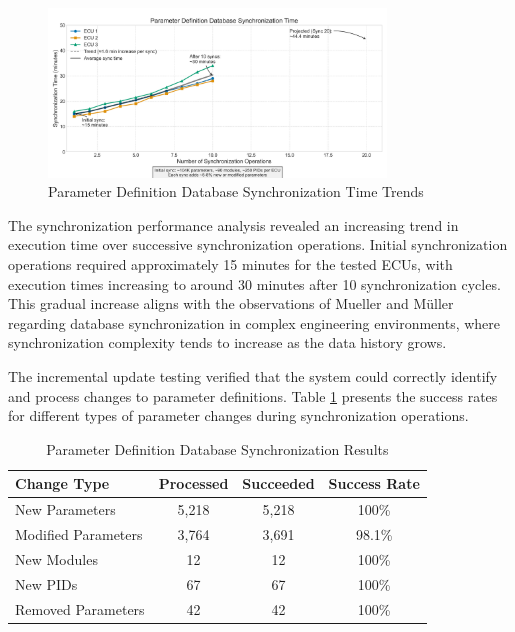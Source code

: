\begin{figure}[h]
    \centering
    \includegraphics[width=0.8\textwidth]{figures/pdd_sync_time_graph.png}
    \caption{Parameter Definition Database Synchronization Time Trends}
    \label{fig:pdd-sync-time}
\end{figure}

The synchronization performance analysis revealed an increasing trend in execution time over successive synchronization operations. Initial synchronization operations required approximately 15 minutes for the tested \acp{ECU}, with execution times increasing to around 30 minutes after 10 synchronization cycles. This gradual increase aligns with the observations of Mueller and Müller \cite{mueller2018conception} regarding database synchronization in complex engineering environments, where synchronization complexity tends to increase as the data history grows.

The incremental update testing verified that the system could correctly identify and process changes to parameter definitions. Table \ref{tab:pdd-sync-results} presents the success rates for different types of parameter changes during synchronization operations.

\begin{table}[h]
\centering
\caption{Parameter Definition Database Synchronization Results}
\label{tab:pdd-sync-results}
\begin{tabular}{|l|c|c|c|}
\hline
\textbf{Change Type} & \textbf{Processed} & \textbf{Succeeded} & \textbf{Success Rate} \\
\hline
New Parameters & 5,218 & 5,218 & 100\% \\
\hline
Modified Parameters & 3,764 & 3,691 & 98.1\% \\
\hline
New Modules & 12 & 12 & 100\% \\
\hline
New PIDs & 67 & 67 & 100\% \\
\hline
Removed Parameters & 42 & 42 & 100\% \\
\hline
\end{tabular}
\end{table}

